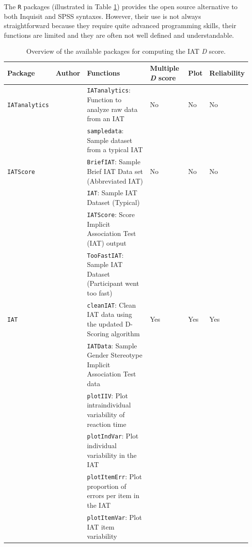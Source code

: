 \documentclass[12pt]{book}
\begin{document}
The \verb*|R| packages (illustrated in Table \ref{tab:dscorepkg}) provides the open source alternative to both Inquisit and SPSS syntaxes.  
However, their use is not always straightforward because they require quite advanced programming skills, their functions are limited and they are often not well defined and understandable.

\begin{landscape}

		\begin{longtable}{p{2.5cm} p{1.5cm} p{10cm} p{1.5cm} p{1.5cm} p{2cm}}
			\caption{\label{tab:dscorepkg} Overview of the available packages for computing the IAT \emph{D} score.}\\
			\toprule
			Package  &  Author  &  Functions  & Multiple \emph{D} score   &    Plot   &  Reliability\\
			\midrule
			\verb*|IATanalytics|  &  \citeA{iatanalytics}  &  \verb*|IATanalytics|: Function to analyze raw data from an IAT  &    No    &    No    &  No\\
			&     &  \verb*|sampledata|: Sample dataset from a typical IAT  &  &  & \\
			\verb*|IATScore|  &  \citeA{iatscore}  &  \verb*|BriefIAT|: Sample Brief IAT Data set (Abbreviated IAT)  &    No    &    No    &  No\\
			&     &  \verb*|IAT|: Sample IAT Dataset (Typical) &  &  & \\
			&     &  \verb*|IATScore|: Score Implicit Association Test (IAT) output  &  &  & \\
			&     &  \verb*|TooFastIAT|: Sample IAT Dataset (Participant went too fast)  &  &  & \\
			\verb*|IAT|  &  \citeA{iat}    &   \verb*|cleanIAT|: Clean IAT data using the updated D-Scoring algorithm &    Yes    &  Yes  &  Yes\\
			&     &  \verb*|IATData|: Sample Gender Stereotype Implicit Association Test data  &  &  & \\
			&     &  \verb*|plotIIV|: Plot intraindividual variability of reaction time  &  &  & \\
			&     &  \verb*|plotIndVar|:  Plot individual variability in the IAT  &  &  & \\
			&     &  \verb*|plotItemErr|: Plot proportion of errors per item in the IAT   &  &  & \\
			&     &  \verb*|plotItemVar|:  Plot IAT item variability  &  &  & \\

\end{longtable}
\end{landscape}
\end{document}
